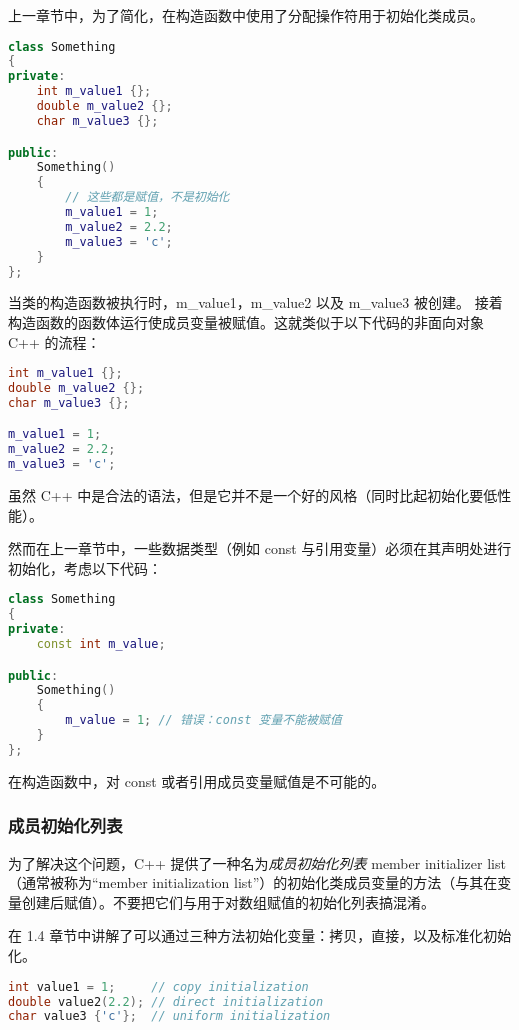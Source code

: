 \documentclass[../../LearnCpp.tex]{subfiles}
\begin{document}

上一章节中，为了简化，在构造函数中使用了分配操作符用于初始化类成员。

\begin{lstlisting}[language=C++]
class Something
{
private:
    int m_value1 {};
    double m_value2 {};
    char m_value3 {};

public:
    Something()
    {
        // 这些都是赋值，不是初始化
        m_value1 = 1;
        m_value2 = 2.2;
        m_value3 = 'c';
    }
};
\end{lstlisting}

当类的构造函数被执行时，m\_value1，m\_value2 以及 m\_value3 被创建。
接着构造函数的函数体运行使成员变量被赋值。这就类似于以下代码的非面向对象 C++ 的流程：

\begin{lstlisting}[language=C++]
int m_value1 {};
double m_value2 {};
char m_value3 {};

m_value1 = 1;
m_value2 = 2.2;
m_value3 = 'c';
\end{lstlisting}

虽然 C++ 中是合法的语法，但是它并不是一个好的风格（同时比起初始化要低性能）。

然而在上一章节中，一些数据类型（例如 const 与引用变量）必须在其声明处进行初始化，考虑以下代码：

\begin{lstlisting}[language=C++]
class Something
{
private:
    const int m_value;

public:
    Something()
    {
        m_value = 1; // 错误：const 变量不能被赋值
    }
};
\end{lstlisting}

在构造函数中，对 const 或者引用成员变量赋值是不可能的。

\subsubsection*{成员初始化列表}

为了解决这个问题，C++ 提供了一种名为\textit{成员初始化列表} member initializer list（通常被称为“member initialization list”）的初始化类成员变量的方法（与其在变量创建后赋值）。不要把它们与用于对数组赋值的初始化列表搞混淆。

在 1.4 章节中讲解了可以通过三种方法初始化变量：拷贝，直接，以及标准化初始化。

\begin{lstlisting}[language=C++]
int value1 = 1;     // copy initialization
double value2(2.2); // direct initialization
char value3 {'c'};  // uniform initialization
\end{lstlisting}
\end{document}
